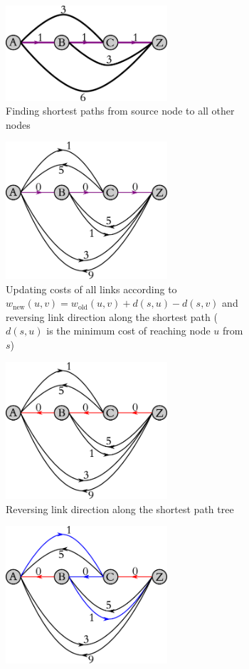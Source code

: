 \documentclass[10pt,letterpaper]{article}
\begin{document}
\begin{figure}[h]
\centering
\begin{subfigure}{0.49\textwidth}
\includegraphics[width=60mm]{bhandari_suurballe1_1}
\caption{
Finding shortest paths from source node to all other nodes
}
\end{subfigure}
\begin{subfigure}{0.49\textwidth}
\includegraphics[width=60mm]{bhandari_suurballe2_2}
\caption{
Updating costs of all links according to 
$
w_\text{new}(u,v)
=
w_\text{old}(u,v)+d(s,u)-d(s,v)
$
and reversing link direction along the shortest path ($d(s,u)$ is the minimum cost of reaching node $u$ from $s$)
}
\end{subfigure}
\begin{subfigure}{0.49\textwidth}
\includegraphics[width=60mm]{bhandari_suurballe2_3}
\caption{
Reversing link direction along the shortest path tree
}
\end{subfigure}
\begin{subfigure}{0.49\textwidth}
\includegraphics[width=60mm]{bhandari_suurballe2_4}

\end{subfigure}
\end{figure}
\end{document}
